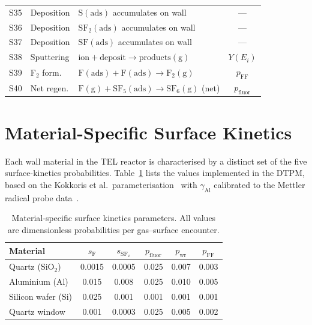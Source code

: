 \documentclass[11pt,a4paper]{report}
\newcommand{\SFsix}{\mathrm{SF}_6}
\newcommand{\SFfive}{\mathrm{SF}_5}
\begin{document}
\begin{longtable}{@{}clp{5.5cm}c@{}}
S35 & Deposition & $\mathrm{S(ads)}$ accumulates on wall & --- \\
S36 & Deposition & $\mathrm{SF_2(ads)}$ accumulates on wall & --- \\
S37 & Deposition & $\mathrm{SF(ads)}$ accumulates on wall & --- \\
S38 & Sputtering & $\mathrm{ion} + \mathrm{deposit} \to \mathrm{products(g)}$ & $Y(E_i)$ \\
S39 & F$_2$ form. & $\mathrm{F(ads)} + \mathrm{F(ads)} \to \mathrm{F_2(g)}$ & $p_\mathrm{FF}$ \\
S40 & Net regen. & $\mathrm{F(g)} + \SFfive\mathrm{(ads)} \to \SFsix\mathrm{(g)}$ (net) & $p_\mathrm{fluor}$ \\
\bottomrule
\end{longtable}


\section{Material-Specific Surface Kinetics}
\label{sec:surface-kinetics}

Each wall material in the TEL reactor is characterised by a distinct set of the five surface-kinetics probabilities.  Table~\ref{tab:surface-kinetics} lists the values implemented in the DTPM, based on the Kokkoris et al.\ parameterisation~\cite{Kokkoris2009} with $\gamma_\mathrm{Al}$ calibrated to the Mettler radical probe data~\cite{Mettler2025}.

\begin{table}[H]
\centering
\caption{Material-specific surface kinetics parameters.  All values are dimensionless probabilities per gas--surface encounter.}
\label{tab:surface-kinetics}
\begin{tabular}{@{}lccccc@{}}
\toprule
\textbf{Material} & $s_\mathrm{F}$ & $s_{\mathrm{SF}_x}$ & $p_\mathrm{fluor}$ & $p_\mathrm{wr}$ & $p_\mathrm{FF}$ \\
\midrule
Quartz (SiO$_2$)   & 0.0015 & 0.0005 & 0.025  & 0.007  & 0.003 \\
Aluminium (Al)      & 0.015  & 0.008  & 0.025  & 0.010  & 0.005 \\
Silicon wafer (Si)  & 0.025  & 0.001  & 0.001  & 0.001  & 0.001 \\
Quartz window       & 0.001  & 0.0003 & 0.025  & 0.005  & 0.002 \\
\bottomrule
\end{tabular}
\end{table}
\end{document}
